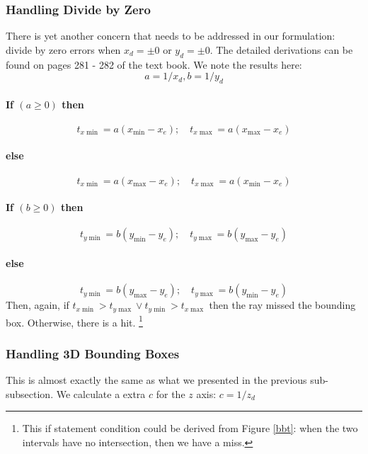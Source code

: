 \documentclass[11pt]{article}
\begin{document}
\subsubsection{Handling Divide by Zero}
There is yet another concern that needs to be addressed in our formulation: divide by zero errors when $x_d = \pm 0$ or $y_d = \pm 0$. The detailed derivations can be found on pages 281 - 282 of the text book. We note the results here: 
\begin{equation}
	a = 1 / x_d, b = 1 / y_d
\end{equation}
\paragraph{If $(a \geq 0)$ then}
\begin{equation}
	t_{x\min} = a(x_{\min} - x_e); \quad t_{x\max} = a(x_{\max} - x_e)
\end{equation}
\vspace{-3em}
\paragraph{else}
\begin{equation}
	t_{x\min} = a(x_{\max} - x_e); \quad t_{x\max} = a(x_{\min} - x_e)
\end{equation}

\paragraph{If $(b \geq 0)$ then}
\begin{equation}
	t_{y\min} = b(y_{\min} - y_e); \quad t_{y\max} = b(y_{\max} - y_e)
\end{equation}
\vspace{-3em}
\paragraph{else}
\begin{equation}
	t_{y\min} = b(y_{\max} - y_e); \quad t_{y\max} = b(y_{\min} - y_e)
\end{equation}
Then, again, if $t_{x\min} > t_{y\max} \lor  t_{y\min} > t_{x\max} $ then the ray missed the bounding box. Otherwise, there is a hit. \footnote{This if statement condition could be derived from Figure \ref{bbt}: when the two intervals have no intersection, then we have a miss. }

\subsubsection{Handling 3D Bounding Boxes}
This is almost exactly the same as what we presented in the previous sub-subsection. We calculate a extra $c$ for the $z$ axis: $c = 1 / z_d$
\end{document}
